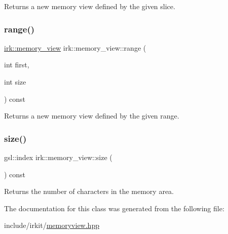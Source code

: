 Returns a new memory view defined by the given slice. 

\mbox{\label{classirk_1_1memory__view_ae5f29465eeab2b4b8bdff14139ec138d}} 
\subsubsection{\texorpdfstring{range()}{range()}}
{\footnotesize\ttfamily \mbox{\hyperlink{classirk_1_1memory__view}{irk\+::memory\+\_\+view}} irk\+::memory\+\_\+view\+::range (\begin{DoxyParamCaption}\item[{int}]{first,  }\item[{int}]{size }\end{DoxyParamCaption}) const\hspace{0.3cm}{\ttfamily [inline]}}



Returns a new memory view defined by the given range. 

\mbox{\label{classirk_1_1memory__view_ac059705d698fc494739ac4245c6ed29f}} 
\subsubsection{\texorpdfstring{size()}{size()}}
{\footnotesize\ttfamily gsl\+::index irk\+::memory\+\_\+view\+::size (\begin{DoxyParamCaption}{ }\end{DoxyParamCaption}) const\hspace{0.3cm}{\ttfamily [inline]}}



Returns the number of characters in the memory area. 



The documentation for this class was generated from the following file\+:\begin{DoxyCompactItemize}
\item 
include/irkit/\mbox{\hyperlink{memoryview_8hpp}{memoryview.\+hpp}}\end{DoxyCompactItemize}
